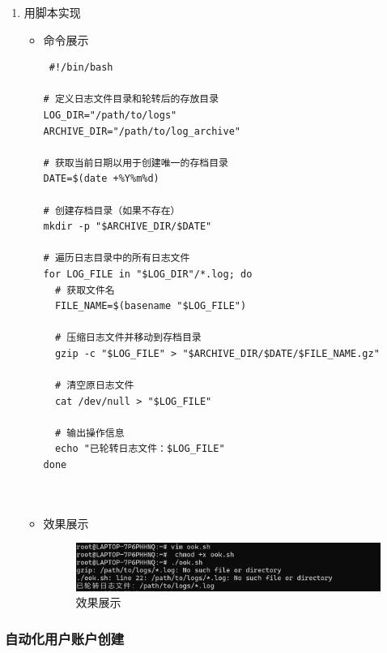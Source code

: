 \documentclass[UTF8]{ctexart}
\begin{document}
\begin{enumerate}
  \item 用脚本实现
  \begin{itemize}
  \item 命令展示
  \begin{verbatim}
 #!/bin/bash

# 定义日志文件目录和轮转后的存放目录
LOG_DIR="/path/to/logs"
ARCHIVE_DIR="/path/to/log_archive"

# 获取当前日期以用于创建唯一的存档目录
DATE=$(date +%Y%m%d)

# 创建存档目录（如果不存在）
mkdir -p "$ARCHIVE_DIR/$DATE"

# 遍历日志目录中的所有日志文件
for LOG_FILE in "$LOG_DIR"/*.log; do
  # 获取文件名
  FILE_NAME=$(basename "$LOG_FILE")
  
  # 压缩日志文件并移动到存档目录
  gzip -c "$LOG_FILE" > "$ARCHIVE_DIR/$DATE/$FILE_NAME.gz"
  
  # 清空原日志文件
  cat /dev/null > "$LOG_FILE"
  
  # 输出操作信息
  echo "已轮转日志文件：$LOG_FILE"
done

    
  \end{verbatim}

  \item 效果展示
  \begin{figure}[H]
    \centering
    \includegraphics[width=\textwidth]{9} %
    \caption{效果展示}
  
  \end{figure}
\end{itemize}
\end{enumerate}

\subsubsection{自动化用户账户创建}
\end{document}
